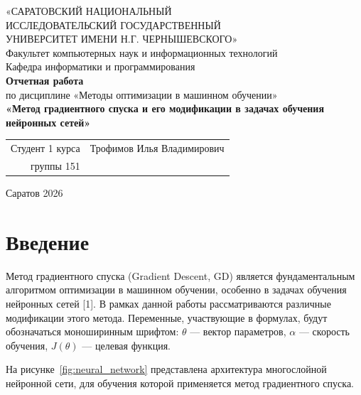 \documentclass{SCWorks}
\begin{document}
	\sloppy  %
	
	\begin{titlepage}
		\begin{center}
			\large
			«САРАТОВСКИЙ НАЦИОНАЛЬНЫЙ\\
			ИССЛЕДОВАТЕЛЬСКИЙ ГОСУДАРСТВЕННЫЙ\\
			УНИВЕРСИТЕТ ИМЕНИ Н.Г. ЧЕРНЫШЕВСКОГО»\\
			\vspace{2cm}
			Факультет компьютерных наук и информационных технологий\\
			Кафедра информатики и программирования\\
			\vspace{3cm}
			\textbf{Отчетная работа}\\
			\vspace{0.5cm}
			по дисциплине «Методы оптимизации в машинном обучении»\\
			\vspace{2cm}
			\textbf{«Метод градиентного спуска и его модификации в задачах обучения нейронных сетей»}\\
			\vspace{3cm}
			\begin{flushright}
				\begin{tabular}{rl}
					Студент 1 курса & Трофимов Илья Владимирович \\
					группы 151 & \\
				\end{tabular}
			\end{flushright}
			\vfill
			Саратов 2026
		\end{center}
	\end{titlepage}
	
	\tableofcontents
	\newpage
	
	\section{Введение}
	
	Метод градиентного спуска (Gradient Descent, GD) является фундаментальным алгоритмом оптимизации в машинном обучении, особенно в задачах обучения нейронных сетей [1]. 
	В рамках данной работы рассматриваются различные модификации этого метода. 
	Переменные, участвующие в формулах, будут обозначаться моноширинным шрифтом: \texttt{$\theta$} — вектор параметров, \texttt{$\alpha$} — скорость обучения, \texttt{$J(\theta)$} — целевая функция.
	
	На рисунке~\ref{fig:neural_network} представлена архитектура многослойной нейронной сети, для обучения которой применяется метод градиентного спуска.
	
\end{document}
